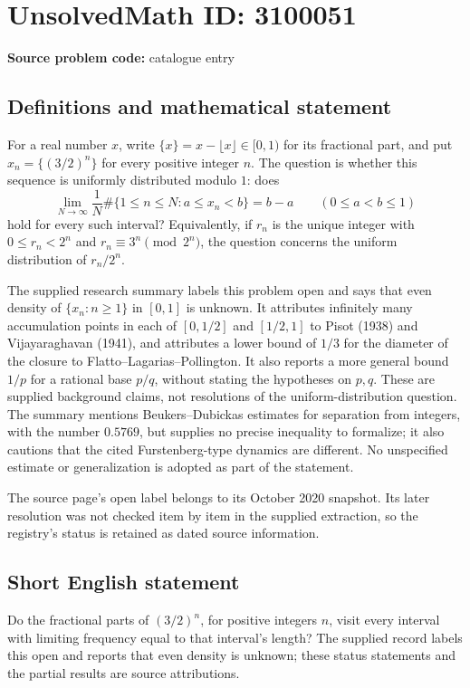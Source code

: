 \documentclass[11pt]{article}
\begin{document}
\section*{UnsolvedMath ID: 3100051}
\textbf{Source problem code:} catalogue entry
\subsection{Definitions and mathematical statement}
For a real number \(x\), write \(\{x\}=x-\lfloor x\rfloor\in[0,1)\) for its fractional part, and put \(x_n=\{(3/2)^n\}\) for every positive integer \(n\). The question is whether this sequence is uniformly distributed modulo \(1\): does
\[
\lim_{N\to\infty}\frac{1}{N}\#\{1\le n\le N:a\le x_n<b\}=b-a
\qquad(0\le a<b\le1)
\]
hold for every such interval? Equivalently, if \(r_n\) is the unique integer with \(0\le r_n<2^n\) and \(r_n\equiv3^n\pmod {2^n}\), the question concerns the uniform distribution of \(r_n/2^n\).

The supplied research summary labels this problem open and says that even density of \(\{x_n:n\ge1\}\) in \([0,1]\) is unknown. It attributes infinitely many accumulation points in each of \([0,1/2]\) and \([1/2,1]\) to Pisot (1938) and Vijayaraghavan (1941), and attributes a lower bound of \(1/3\) for the diameter of the closure to Flatto--Lagarias--Pollington. It also reports a more general bound \(1/p\) for a rational base \(p/q\), without stating the hypotheses on \(p,q\). These are supplied background claims, not resolutions of the uniform-distribution question. The summary mentions Beukers--Dubickas estimates for separation from integers, with the number \(0.5769\), but supplies no precise inequality to formalize; it also cautions that the cited Furstenberg-type dynamics are different. No unspecified estimate or generalization is adopted as part of the statement.

The source page's open label belongs to its October 2020 snapshot. Its later resolution was not checked item by item in the supplied extraction, so the registry's status is retained as dated source information.
\subsection{Short English statement}
Do the fractional parts of \((3/2)^n\), for positive integers \(n\), visit every interval with limiting frequency equal to that interval's length? The supplied record labels this open and reports that even density is unknown; these status statements and the partial results are source attributions.
\end{document}
